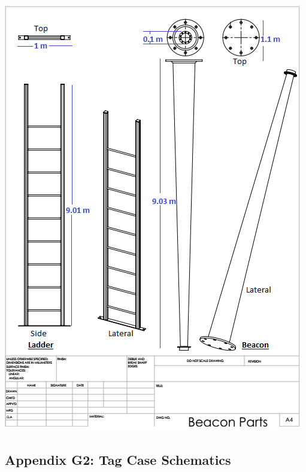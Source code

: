 \newpage
\begin{center}
\includegraphics[scale=1.3]{data/mechanical/a1.png}
\end{center}

\newpage
\vspace*{\fill}
\begin{center}
\subsection*{Appendix G2: Tag Case Schematics}
\end{center}
\vspace*{\fill}

